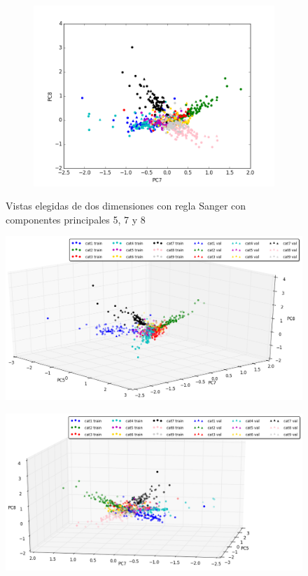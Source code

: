 \begin{figure}[ht!]	
	~\centering
	\begin{subfigure}[b]{0.5\textwidth}
		\includegraphics[width=\linewidth]{img/sanger/9dim-pc7-pc8.png}
	\end{subfigure}%
	\caption{Vistas elegidas de dos dimensiones con regla Sanger con componentes principales 5, 7 y 8}
\end{figure}


\begin{figure}[ht!]
	\centering
	\includegraphics[width=0.85\linewidth]{img/parte1-vista3d-sanger-9dim1.png}

\end{figure}

\begin{figure}[ht!]
	\centering
	\includegraphics[width=0.85\linewidth]{img/parte1-vista3d-sanger-9dim2.png}

\end{figure}

